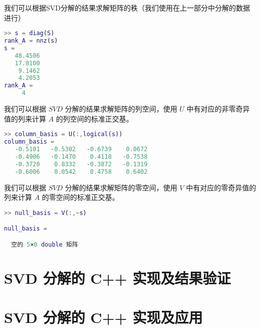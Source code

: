 我们可以根据SVD分解的结果求解矩阵的秩（我们使用在上一部分中分解的数据进行）
\begin{lstlisting}[language=Matlab]  
>> s = diag(S)
rank_A = nnz(s)
s =
   48.4506
   17.8100
    9.1462
    4.2053
rank_A =
     4
\end{lstlisting}


我们可以根据 $SVD$ 分解的结果求解矩阵的列空间，使用 $U$ 中有对应的非零奇异值的列来计算 $A$ 的列空间的标准正交基。
\begin{lstlisting}[language=Matlab]  
>> column_basis = U(:,logical(s))
column_basis =
   -0.5101   -0.5302   -0.6739    0.0672
   -0.4906   -0.1470    0.4118   -0.7538
   -0.3720    0.8332   -0.3872   -0.1319
   -0.6006    0.0542    0.4758    0.6402
\end{lstlisting}

我们可以根据 $SVD$ 分解的结果求解矩阵的零空间，使用 $V$ 中有对应的零奇异值的列来计算 $A$ 的零空间的标准正交基。
\begin{lstlisting}[language=Matlab]  
>> null_basis = V(:,~s)

null_basis =

  空的 5×0 double 矩阵
\end{lstlisting}


\section{SVD 分解的 C++ 实现及结果验证}
\section{SVD 分解的 C++ 实现及应用}
